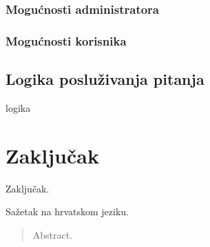 \documentclass[times, utf8, zavrsni]{fer}
\begin{document}
\subsection{Mogućnosti administratora}

\subsection{Mogućnosti korisnika}

\section{Logika posluživanja pitanja}
logika

\chapter{Zaključak}
Zaključak.




\begin{sazetak}
Sažetak na hrvatskom jeziku.

\end{sazetak}

\begin{abstract}
Abstract.

\end{abstract}
\end{document}
